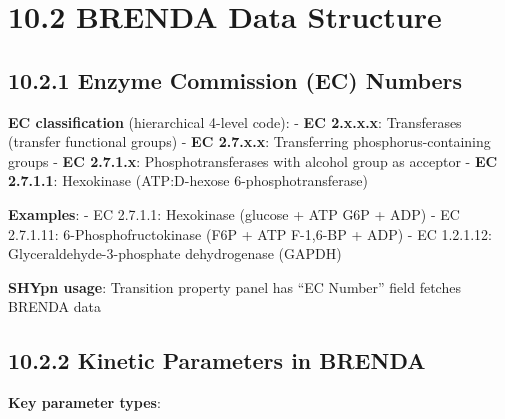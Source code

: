\hypertarget{brenda-data-structure}{%
\section{10.2 BRENDA Data Structure}\label{brenda-data-structure}}

\hypertarget{enzyme-commission-ec-numbers}{%
\subsection{10.2.1 Enzyme Commission (EC)
Numbers}\label{enzyme-commission-ec-numbers}}

\textbf{EC classification} (hierarchical 4-level code): - \textbf{EC
2.x.x.x}: Transferases (transfer functional groups) - \textbf{EC
2.7.x.x}: Transferring phosphorus-containing groups - \textbf{EC
2.7.1.x}: Phosphotransferases with alcohol group as acceptor -
\textbf{EC 2.7.1.1}: Hexokinase (ATP:D-hexose 6-phosphotransferase)

\textbf{Examples}: - EC 2.7.1.1: Hexokinase (glucose + ATP \textrightarrow G6P + ADP)
- EC 2.7.1.11: 6-Phosphofructokinase (F6P + ATP \textrightarrow F-1,6-BP + ADP) - EC
1.2.1.12: Glyceraldehyde-3-phosphate dehydrogenase (GAPDH)

\textbf{SHYpn usage}: Transition property panel has ``EC Number'' field
\textrightarrow fetches BRENDA data

\hypertarget{kinetic-parameters-in-brenda}{%
\subsection{10.2.2 Kinetic Parameters in
BRENDA}\label{kinetic-parameters-in-brenda}}

\textbf{Key parameter types}:

